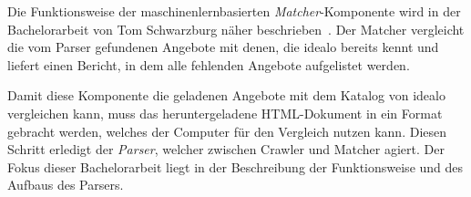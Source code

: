 Die Funktionsweise der maschinenlernbasierten \textit{Matcher}-Komponente wird in der Bachelorarbeit von Tom
Schwarzburg näher beschrieben~\cite{thesis:tom}.
Der Matcher vergleicht die vom Parser gefundenen Angebote mit denen, die idealo bereits kennt und liefert
einen Bericht, in dem alle fehlenden Angebote aufgelistet werden.

Damit diese Komponente die geladenen Angebote mit dem Katalog von idealo vergleichen kann, muss das heruntergeladene
HTML-Dokument in ein Format gebracht werden, welches der Computer für den Vergleich nutzen kann.
Diesen Schritt erledigt der \textit{Parser}, welcher zwischen Crawler und Matcher agiert.
Der Fokus dieser Bachelorarbeit liegt in der Beschreibung der Funktionsweise und des Aufbaus des Parsers.